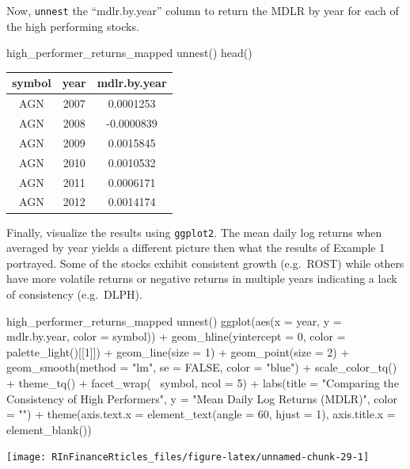 Now, \texttt{unnest} the ``mdlr.by.year'' column to return the MDLR by
year for each of the high performing stocks.

\begin{Schunk}
\begin{Sinput}
high_performer_returns_mapped %
    unnest() %
    head()
\end{Sinput}
\end{Schunk}

\begin{tabular}{ccc}
\toprule
symbol & year & mdlr.by.year\\
\midrule
AGN & 2007 & 0.0001253\\
AGN & 2008 & -0.0000839\\
AGN & 2009 & 0.0015845\\
AGN & 2010 & 0.0010532\\
AGN & 2011 & 0.0006171\\
AGN & 2012 & 0.0014174\\
\bottomrule
\end{tabular}

\hspace{20 mm}

Finally, visualize the results using \texttt{ggplot2}. The mean daily
log returns when averaged by year yields a different picture then what
the results of Example 1 portrayed. Some of the stocks exhibit
consistent growth (e.g.~ROST) while others have more volatile returns or
negative returns in multiple years indicating a lack of consistency
(e.g.~DLPH).

\begin{Schunk}
\begin{Sinput}
high_performer_returns_mapped %
    unnest() %
    ggplot(aes(x = year, y = mdlr.by.year, color = symbol)) +
    geom_hline(yintercept = 0, color = palette_light()[[1]]) +
    geom_line(size = 1) +
    geom_point(size = 2) +
    geom_smooth(method = "lm", se = FALSE, color = "blue") +
    scale_color_tq() +
    theme_tq() +
    facet_wrap(~ symbol, ncol = 5) +
    labs(title = "Comparing the Consistency of High Performers",
         y = "Mean Daily Log Returns (MDLR)", color = "") +
    theme(axis.text.x = element_text(angle = 60, hjust = 1),
          axis.title.x = element_blank())
\end{Sinput}


\begin{center}\texttt{[image: RInFinanceRticles\_files/figure-latex/unnamed-chunk-29-1]} \end{center}

\end{Schunk}

